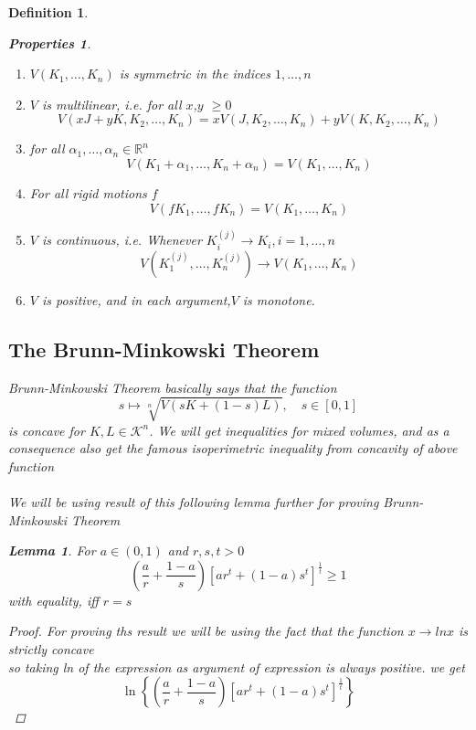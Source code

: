 \documentclass[oneside]{book}
\newtheorem{lemma}[theorem]{Lemma}
\newtheorem{mydef}{Definition}
\newtheorem{properties}{Properties}[section]
\begin{document}
\begin{mydef}
\begin{properties}
\begin{enumerate}
\item 
$V\left(K_{1}, \ldots, K_{n}\right)$ is symmetric in the indices $1,\ldots, n$
\item
 $V$ is multilinear, i.e.
 for all $ x$,$y$ $\geq 0 $
$$
V\left(x J+y K, K_{2}, \ldots, K_{n}\right)=x V\left(J, K_{2}, \ldots, K_{n}\right)+y V\left(K, K_{2}, \ldots, K_{n}\right)
$$
\item
for all $\alpha_{1}, \ldots, \alpha_{n} \in \mathbb{R}^{n}$
$$
V\left(K_{1}+\alpha_{1}, \ldots, K_{n}+\alpha_{n}\right)=V\left(K_{1}, \ldots, K_{n}\right)
$$
\item  
For all rigid motions $f$ 
$$ 
V\left(f K_{1}, \ldots, f K_{n}\right)=V\left(K_{1}, \ldots, K_{n}\right)
$$ 
\item
$V$ is continuous, i.e.
Whenever $K_{i}^{(j)} \rightarrow K_{i}, i=1, \ldots, n$
\[
V\left(K_{1}^{(j)}, \ldots, K_{n}^{(j)}\right) \rightarrow V\left(K_{1}, \ldots, K_{n}\right)
\]
\item $V$ is positive, and in each argument,$V$ is monotone.	 
 
  \end{enumerate}
 \end{properties}
 
 \subsection{The Brunn-Minkowski Theorem}
  \label{ss:21}
 Brunn-Minkowski Theorem  basically says that the function 
 \[s  \mapsto \sqrt[n]{V(s K+(1- s) L)}, \quad s \in[0,1]
\]
 is concave for $ K, L \in \mathcal{K}^n $.
We will get inequalities for mixed volumes, and as a consequence also get the famous isoperimetric inequality from concavity of above function
\\\\
We will be using result of this following lemma further for proving Brunn-Minkowski Theorem
\begin{lemma} 
\label{l:2}
For $a \in(0,1)$ and $r, s, t>0$
\[
\left(\frac{a}{r}+\frac{1-a}{s}\right)\left[a r^{t}+(1-a) s^{t}\right]^{\frac{1}{t}} \geq 1
\]
with equality, iff $r=s$
\end{lemma} 
 \begin{proof}
 
 For proving ths result we will be using the fact that the function $x \rightarrow lnx $ is strictly concave \\
 so taking ln of the expression as argument of expression is always positive. we get 
 $$\ln \left\{\left(\frac{a}{r}+\frac{1-a}{s}\right)\left[a r^{t}+(1-a) s^{t}\right]^{\frac{1}{t}}\right\}$$
 

\end{proof}
\end{mydef}
\end{document}
